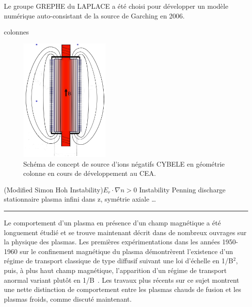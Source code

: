 \begin{refsection}
Le groupe GREPHE du LAPLACE a été choisi pour
développer un modèle numérique auto-consistant de la source de Garching en 2006.




colonnes

\begin{figure}[htbp]
\centering
\includegraphics[width=0.4\textwidth]{figures/sourceSimonin1.png}
{\caption{Schéma de concept de source d'ions négatifs CYBELE en géométrie colonne en
   cours de développement au CEA.}\label{CYBELEIonSource}}
\end{figure}

\parencite{RosenbluthSimon}
\parencite{Sakawa} (Modified Simon Hoh Instability)$E_r\cdot\nabla n > 0$
\parencite{Hoh} Instability Penning discharge
\parencite{Fruchtman} stationnaire
\parencite{Sternberg} plasma infini dans z, symétrie axiale \ldots 

\parencite{Rosenbluth}\parencite{Chandrasekhar}
\begin{center}
\rule{0.6\textwidth}{1pt}
\end{center}

Le comportement d'un plasma en présence d'un champ magnétique a été
longuement étudié et se trouve maintenant décrit dans de nombreux ouvrages sur
la physique des plasmas.
Les premières expérimentations dans les années 1950-1960 sur le confinement
magnétique du plasma démontrèrent l'existence d'un régime de transport classique
de type diffusif suivant une loi d'échelle en 1/B$^2$, puis, à plus haut champ
magnétique, l'apparition d'un régime de transport anormal variant plutôt en
1/B~\parencite{Bohm,Simon55,Yoshikawa,Janes,Rozhansky}. Les travaux plus
récents sur ce sujet montrent une nette distinction de
comportement entre les plasmas chauds de fusion et les plasmas froids, comme
discuté maintenant.


\end{refsection}
